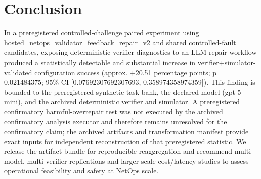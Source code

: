 \documentclass[conference]{IEEEtran}
\begin{document}
\section{Conclusion}
In a preregistered controlled-challenge paired experiment using hosted\_netops\_validator\_feedback\_repair\_v2 and shared controlled-fault candidates, exposing deterministic verifier diagnostics to an LLM repair workflow produced a statistically detectable and substantial increase in verifier+simulator-validated configuration success (approx. +20.51 percentage points; p = 0.021484375; 95\% CI [0.07692307692307693, 0.358974358974359]). This finding is bounded to the preregistered synthetic task bank, the declared model (gpt-5-mini), and the archived deterministic verifier and simulator. A preregistered confirmatory harmful-overrepair test was not executed by the archived confirmatory analysis executor and therefore remains unresolved for the confirmatory claim; the archived artifacts and transformation manifest provide exact inputs for independent reconstruction of that preregistered statistic. We release the artifact bundle for reproducible reaggregation and recommend multi-model, multi-verifier replications and larger-scale cost/latency studies to assess operational feasibility and safety at NetOps scale.
\end{document}
